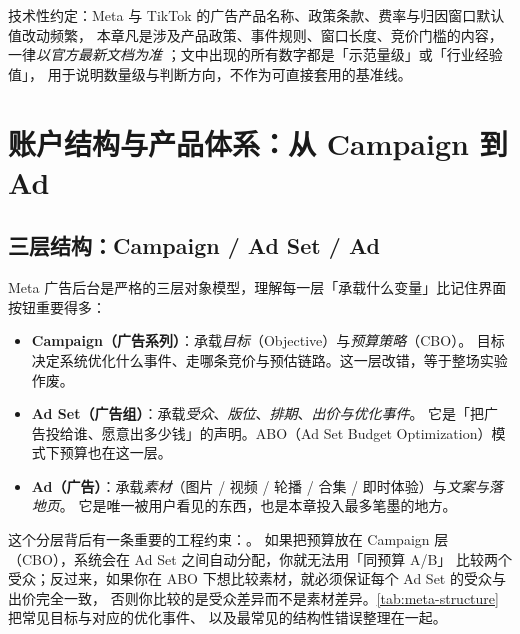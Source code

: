 技术性约定：Meta 与 TikTok 的广告产品名称、政策条款、费率与归因窗口默认值改动频繁，
本章凡是涉及产品政策、事件规则、窗口长度、竞价门槛的内容，一律\emph{以官方最新文档为准}
\cite{meta_advantage}；文中出现的所有数字都是「示范量级」或「行业经验值」，
用于说明数量级与判断方向，不作为可直接套用的基准线。

\section{账户结构与产品体系：从 Campaign 到 Ad}
\label{sec:meta-structure}

\subsection{三层结构：Campaign / Ad Set / Ad}

Meta 广告后台是严格的三层对象模型，理解每一层「承载什么变量」比记住界面按钮重要得多：

\begin{itemize}
  \item \textbf{Campaign（广告系列）}：承载\emph{目标}（Objective）与\emph{预算策略}（CBO）。
        目标决定系统优化什么事件、走哪条竞价与预估链路。这一层改错，等于整场实验作废。
  \item \textbf{Ad Set（广告组）}：承载\emph{受众}、\emph{版位}、\emph{排期}、\emph{出价与优化事件}。
        它是「把广告投给谁、愿意出多少钱」的声明。ABO（Ad Set Budget Optimization）模式下预算也在这一层。
  \item \textbf{Ad（广告）}：承载\emph{素材}（图片 / 视频 / 轮播 / 合集 / 即时体验）与\emph{文案与落地页}。
        它是唯一被用户看见的东西，也是本章投入最多笔墨的地方。
\end{itemize}

这个分层背后有一条重要的工程约束：。
如果把预算放在 Campaign 层（CBO），系统会在 Ad Set 之间自动分配，你就无法用「同预算 A/B」
比较两个受众；反过来，如果你在 ABO 下想比较素材，就必须保证每个 Ad Set 的受众与出价完全一致，
否则你比较的是受众差异而不是素材差异。\cref{tab:meta-structure} 把常见目标与对应的优化事件、
以及最常见的结构性错误整理在一起。

